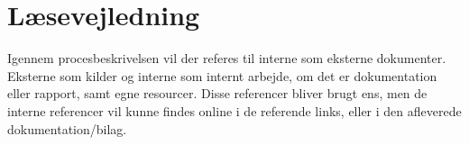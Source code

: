 \chapter{Læsevejledning}

Igennem procesbeskrivelsen vil der referes til interne som eksterne dokumenter. Eksterne som kilder og interne som internt arbejde, om det er dokumentation eller rapport, samt egne resourcer. Disse referencer bliver brugt ens, men de interne referencer vil kunne findes online i de referende links, eller i den afleverede dokumentation/bilag.